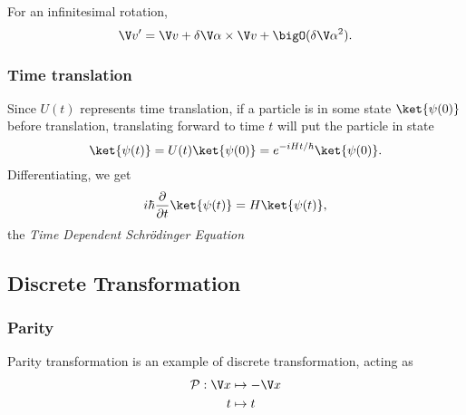 \documentclass[a4paper]{article}
\newcommand*{\parity}{\mathcal{P}}
\theoremstyle{definition}
\begin{document}
For an infinitesimal rotation,
\[
  \V v' = \V v + \delta\V \alpha\times \V v + \bigO(\delta\V\alpha^2).
\]

\subsubsection{Time translation}

Since \(U(t)\) represents time translation, if a particle is in some state \(\ket{\psi(0)}\) before translation, translating forward to time \(t\) will put the particle in state
\[
  \ket{\psi(t)} = U(t) \ket{\psi(0)} = e^{-iHt/\hbar}\ket{\psi(0)}.
\]
Differentiating, we get
\[
  i\hbar \frac{\partial}{\partial t} \ket{\psi(t)} = H\ket{\psi(t)},
\]
the \emph{Time Dependent Schrödinger Equation}

\subsection{Discrete Transformation}

\subsubsection{Parity}

Parity transformation is an example of discrete transformation, acting as
\begin{align*}
  \parity : \V x &\mapsto - \V x \\
  t &\mapsto t
\end{align*}
\end{document}
